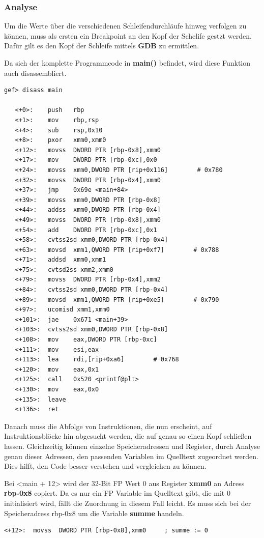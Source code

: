 \documentclass[12pt]{article}
\begin{document}
\subsubsection*{Analyse}
Um die Werte über die verschiedenen Schleifendurchläufe hinweg verfolgen zu können, muss als ersten ein Breakpoint an den Kopf der Schelife gestzt werden. Dafür gilt es den Kopf der Schleife mittels \textbf{GDB} zu ermittlen.

Da sich der komplette Programmcode in \textbf{main()} befindet, wird diese Funktion auch disassembliert.
\begin{lstlisting}
gef> disass main

   <+0>:	push   rbp
   <+1>:	mov    rbp,rsp
   <+4>:	sub    rsp,0x10
   <+8>:	pxor   xmm0,xmm0
   <+12>:	movss  DWORD PTR [rbp-0x8],xmm0
   <+17>:	mov    DWORD PTR [rbp-0xc],0x0
   <+24>:	movss  xmm0,DWORD PTR [rip+0x116]        # 0x780
   <+32>:	movss  DWORD PTR [rbp-0x4],xmm0
   <+37>:	jmp    0x69e <main+84>
   <+39>:	movss  xmm0,DWORD PTR [rbp-0x8]
   <+44>:	addss  xmm0,DWORD PTR [rbp-0x4]
   <+49>:	movss  DWORD PTR [rbp-0x8],xmm0
   <+54>:	add    DWORD PTR [rbp-0xc],0x1
   <+58>:	cvtss2sd xmm0,DWORD PTR [rbp-0x4]
   <+63>:	movsd  xmm1,QWORD PTR [rip+0xf7]        # 0x788
   <+71>:	addsd  xmm0,xmm1
   <+75>:	cvtsd2ss xmm2,xmm0
   <+79>:	movss  DWORD PTR [rbp-0x4],xmm2
   <+84>:	cvtss2sd xmm0,DWORD PTR [rbp-0x4]
   <+89>:	movsd  xmm1,QWORD PTR [rip+0xe5]        # 0x790
   <+97>:	ucomisd xmm1,xmm0
   <+101>:	jae    0x671 <main+39>
   <+103>:	cvtss2sd xmm0,DWORD PTR [rbp-0x8]
   <+108>:	mov    eax,DWORD PTR [rbp-0xc]
   <+111>:	mov    esi,eax
   <+113>:	lea    rdi,[rip+0xa6]        # 0x768
   <+120>:	mov    eax,0x1
   <+125>:	call   0x520 <printf@plt>
   <+130>:	mov    eax,0x0
   <+135>:	leave
   <+136>:	ret
\end{lstlisting}
Danach muss die Abfolge von Instruktionen, die nun erscheint, auf Instruktionsblöcke hin abgesucht werden, die auf genau so einen Kopf schließen lassen. Gleichzeitig können einzelne Speicheradressen und Register, durch Analyse genau dieser Adressen, den passenden Variablen im Quelltext zugeordnet werden. Dies hilft, den Code besser verstehen und vergleichen zu können.

Bei <main + 12> wird der 32-Bit FP Wert 0 aus Register \textbf{xmm0} an Adress \textbf{rbp-0x8} copiert. Da es nur ein FP Variable im Quelltext gibt, die mit 0 initialisiert wird, fällt die Zuordnung in diesem Fall leicht. Es muss sich bei der Speicheradress rbp-0x8 um die Variable \textbf{summe} handeln.
\begin{lstlisting}
<+12>:	movss  DWORD PTR [rbp-0x8],xmm0		; summe := 0
\end{lstlisting}
\end{document}
